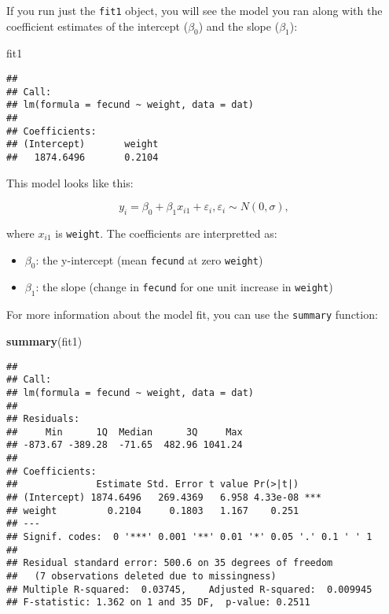 \documentclass[]{book}
\newenvironment{Shaded}{\begin{snugshade}}{\end{snugshade}}
\newcommand{\KeywordTok}[1]{\textcolor[rgb]{0.13,0.29,0.53}{\textbf{#1}}}
\newcommand{\NormalTok}[1]{#1}
\providecommand{\tightlist}{%
  \setlength{\itemsep}{0pt}\setlength{\parskip}{0pt}}
\theoremstyle{definition}
\theoremstyle{definition}
\theoremstyle{definition}
\theoremstyle{remark}
\begin{document}
If you run just the \texttt{fit1} object, you will see the model you ran
along with the coefficient estimates of the intercept (\(\beta_0\)) and
the slope (\(\beta_1\)):

\begin{Shaded}
\begin{Highlighting}[]
\NormalTok{fit1}
\end{Highlighting}
\end{Shaded}

\begin{verbatim}
## 
## Call:
## lm(formula = fecund ~ weight, data = dat)
## 
## Coefficients:
## (Intercept)       weight  
##   1874.6496       0.2104
\end{verbatim}

This model looks like this:

\begin{equation}
  y_i=\beta_0 + \beta_1 x_{i1} + \varepsilon_i, \varepsilon_i \sim N(0,\sigma),
\label{eq:lin-reg}
\end{equation}

where \(x_{i1}\) is \texttt{weight}. The coefficients are interpretted
as:

\begin{itemize}
\tightlist
\item
  \(\beta_0\): the y-intercept (mean \texttt{fecund} at zero
  \texttt{weight})
\item
  \(\beta_1\): the slope (change in \texttt{fecund} for one unit
  increase in \texttt{weight})
\end{itemize}

For more information about the model fit, you can use the
\texttt{summary} function:

\begin{Shaded}
\begin{Highlighting}[]
\KeywordTok{summary}\NormalTok{(fit1)}
\end{Highlighting}
\end{Shaded}

\begin{verbatim}
## 
## Call:
## lm(formula = fecund ~ weight, data = dat)
## 
## Residuals:
##     Min      1Q  Median      3Q     Max 
## -873.67 -389.28  -71.65  482.96 1041.24 
## 
## Coefficients:
##              Estimate Std. Error t value Pr(>|t|)    
## (Intercept) 1874.6496   269.4369   6.958 4.33e-08 ***
## weight         0.2104     0.1803   1.167    0.251    
## ---
## Signif. codes:  0 '***' 0.001 '**' 0.01 '*' 0.05 '.' 0.1 ' ' 1
## 
## Residual standard error: 500.6 on 35 degrees of freedom
##   (7 observations deleted due to missingness)
## Multiple R-squared:  0.03745,    Adjusted R-squared:  0.009945 
## F-statistic: 1.362 on 1 and 35 DF,  p-value: 0.2511
\end{verbatim}
\end{document}
